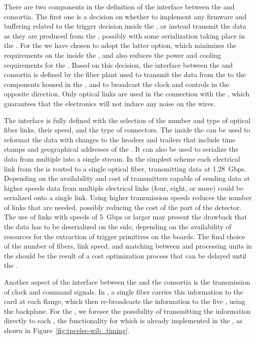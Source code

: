 There are two components in the definition of the interface between the 
and  consortia. The first one is a decision on whether to implement any
firmware and buffering related to the trigger decision inside the , or
instead transmit the data as they are produced from the , possibly with
some serialization taking place in the . For the  %
we have
chosen to adopt the latter option, which minimizes the requirements on the
 inside the , and also reduces the power and cooling requirements for the .
Based on this decision, the interface between the  and  consortia is
defined by the fiber plant
used to transmit the data from the  to the  components housed in the
, and to broadcast the clock and controls in the
opposite direction. Only optical links are used in the connection with the ,
which guarantees that the  electronics will not induce any noise on the
 wires.

The interface is fully defined with the selection of the number
and type of optical fiber links, their speed, and the type of connectors.
The  inside the  can be used to reformat the data with changes to
the headers and trailers that include time stamps and geographical addresses
of the . It can also be used to serialize the data from multiple
  into a single stream. In the simplest scheme each electrical
link from the  is routed to a single optical fiber, transmitting data
at \SI{1.28}{Gbps}. Depending on the availability and cost of transmitters
capable of sending data at higher speeds data from multiple electrical
links (four, eight, or more) could be serialized onto a single link. Using higher transmission
speeds reduces the number of links that are needed, possibly reducing the
cost of the  part of the detector. The use of links with speeds
of \SI{5}{Gbps} or larger may present the
drawback that the data has to be deserialized on the  side, depending
on the availability of resources for the extraction of trigger primitives
on the  boards. The final choice of the number of fibers, link speed, and
matching between  and  processing units in the  should be
the result of a cost optimization process that can be delayed until
the .

Another aspect of the interface between the  and the  consortia is the
transmission of clock and command signals. In , a single fiber
carries this information to the  card at each  flange, which then re-broadcasts
the information to the five , using the  backplane. For the , we
foresee the possibility of transmitting the information directly to each
, the functionality for which is already implemented in the  , as
shown in Figure~\ref{fig:tpcelec-wib_timing}.

